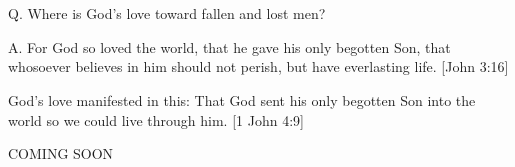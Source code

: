 \documentclass[../main.tex]{subfiles}
\begin{document}
	

	\section*{}
	Q. Where is God's love toward fallen and lost men?

	A. For God so loved the world, that he gave his only begotten Son, that whosoever believes in him should not perish, but have everlasting life. [John 3:16]

	God's love manifested in this: That God sent his only begotten Son into the world so we could live through him. [1 John 4:9]

	COMING SOON
\end{document}
